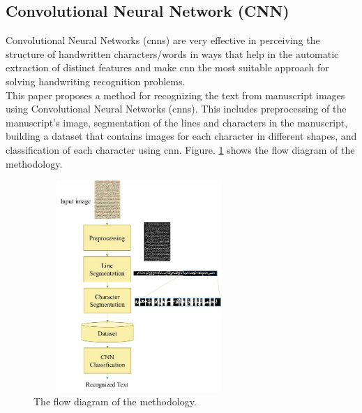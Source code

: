 \subsection{Convolutional Neural Network (CNN)}
Convolutional Neural Networks (\acrshort{cnn}s) are very effective in perceiving the structure of handwritten characters/words in ways that help in the automatic extraction of distinct features and make \acrshort{cnn} the most suitable approach for solving handwriting recognition problems.\\

This paper \cite{CNN} proposes a method for recognizing the text from manuscript images using Convolutional Neural Networks (\acrshort{cnn}s). This includes preprocessing of the manuscript’s image, segmentation of the lines and characters in the manuscript, building a dataset that contains images for each character in different shapes, and classification of each character using \acrshort{cnn}.
Figure. \ref{fig:CNN} shows the flow diagram of the methodology.

\begin{figure}[!htb]
    \centering
    \includegraphics[width=8cm, height=8cm]{images/CNN.png}
    \caption{The flow diagram of the methodology.}
    \label{fig:CNN}
\end{figure}

\newpage

